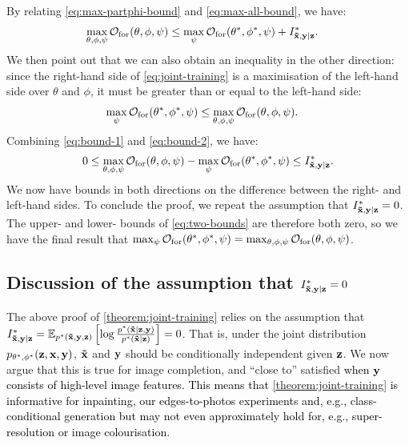 By relating \cref{eq:max-partphi-bound} and \cref{eq:max-all-bound}, we have:
\begin{align}
  \max_{\theta, \phi, \psi } \mathcal{O}_\mathrm{for}(\theta, \phi, \psi ) &\leq  \max_{\psi } \mathcal{O}_\mathrm{for}({\theta}^*, {\phi}^*, \psi ) + I^*_{\mathbf{\tilde{x}}{},\mathbf{y}{}|\mathbf{z}{}}{}. \label{eq:bound-1}
\end{align}
We then point out that we can also obtain an inequality in the other direction: since
the right-hand side of \cref{eq:joint-training} is a maximisation of the left-hand side over $\theta$ and
$\phi$, it must be greater than or equal to the left-hand side:
\begin{align}
  \max_{\psi } \mathcal{O}_\mathrm{for}({\theta}^*, {\phi}^*, \psi ) &\leq  \max_{\theta, \phi, \psi } \mathcal{O}_\mathrm{for}(\theta, \phi, \psi )  . \label{eq:bound-2}
\end{align}
Combining \cref{eq:bound-1} and \cref{eq:bound-2}, we have:
\begin{align}
  0 \leq \max_{\theta, \phi, \psi } \mathcal{O}_\mathrm{for}(\theta, \phi, \psi ) - \max_{\psi } \mathcal{O}_\mathrm{for}({\theta}^*, {\phi}^*, \psi ) \leq I^*_{\mathbf{\tilde{x}}{},\mathbf{y}{}|\mathbf{z}{}}{}. \label{eq:two-bounds}
\end{align}
We now have bounds in both directions on the difference between the right- and
left-hand sides. To conclude the proof, we repeat the assumption that
$I^*_{\mathbf{\tilde{x}}{},\mathbf{y}{}|\mathbf{z}{}}{}=0$. The upper- and lower- bounds of \cref{eq:two-bounds} are
therefore both zero, so we have the final result that ${\max_{\psi }
\mathcal{O}_\mathrm{for}({\theta}^*, {\phi}^*, \psi ) =
\max_{\theta, \phi, \psi } \mathcal{O}_\mathrm{for}(\theta, \phi,
\psi )}$.

\subsection{Discussion of the assumption that $I^*_{\mathbf{\tilde{x}}{},\mathbf{y}{}|\mathbf{z}{}}{}=0$}
The above proof of \cref{theorem:joint-training} relies on the assumption that
$I^*_{\mathbf{\tilde{x}}{},\mathbf{y}{}|\mathbf{z}{}}{} = \mathbb{E}_{{p}^*{}(\mathbf{\tilde{x}}{}, {\mathbf{y}}, {\mathbf{z}})} \left[ \log
  \frac{{p}^*{}(\mathbf{\tilde{x}}{}|{\mathbf{z}}, {\mathbf{y}}) }{ {p}^*{}(\mathbf{\tilde{x}}{}|{\mathbf{z}}) } \right] = 0$.
That is, under the joint distribution $p_{\theta^*,\phi^*}({\mathbf{z}},{\mathbf{x}},{\mathbf{y}})$, $\mathbf{\tilde{x}}{}$ and
${\mathbf{y}}$ should be conditionally independent given ${\mathbf{z}}$. We now argue that this
is true for image completion, and ``close to'' satisfied \textcolor{black}{when
  $\mathbf{y}$ consists of high-level image features. This means that
  \cref{theorem:joint-training} is informative for inpainting, our
  edges-to-photos experiments and, e.g., class-conditional generation but may
  not even approximately hold for, e.g., super-resolution or image
  colourisation.}

